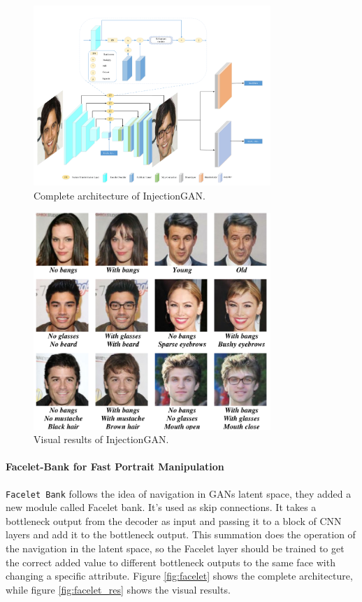 \begin{figure}[H]
    \centering
    \includegraphics[width=0.8\textwidth]{images/injectiongan.png}
    \caption{Complete architecture of InjectionGAN.}
    \label{fig:injgan}
\end{figure}

\begin{figure}[H]
    \centering
    \includegraphics[width=0.8\textwidth]{images/injectiongan-results.png}
    \caption{Visual results of InjectionGAN.}
    \label{fig:injgan_res}
\end{figure}

\paragraph{Facelet-Bank for Fast Portrait Manipulation}
\texttt{Facelet Bank} \cite{chen2018faceletbank} follows the idea of navigation in GANs latent space, they added a new module called Facelet bank. It’s used as skip connections. It takes a bottleneck output from the decoder as input and passing it to a block of CNN layers and add it to the bottleneck output. This summation does the operation of the navigation in the latent space, so the Facelet layer should be trained to get the correct added value to different bottleneck outputs to  the same face with changing a specific attribute. Figure \ref{fig:facelet} shows the complete architecture, while figure \ref{fig:facelet_res} shows the visual results.

